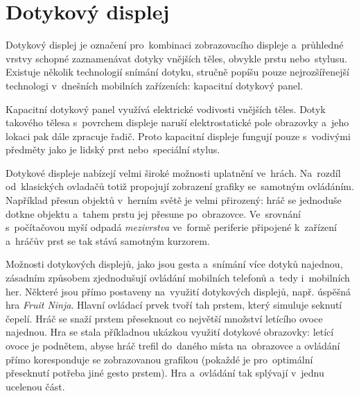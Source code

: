 \documentclass[thesis=B,czech,hidelinks]{FITthesis}[2012/06/26] %
\begin{document}
\section{Dotykový displej}
\label{section:touchscreen}

Dotykový displej je označení pro~kombinaci zobrazovacího displeje a~průhledné vrstvy schopné zaznamenávat dotyky vnějších těles, obvykle prstu nebo~stylusu. Existuje několik technologií snímání dotyku, stručně popíšu pouze nejrozšířenejší technologi v~dnešních mobilních zařízeních: kapacitní dotykový panel.

Kapacitní dotykový panel využívá elektrické vodivosti vnějších těles. Dotyk takového tělesa s~povrchem displeje naruší elektrostatické pole obrazovky a~jeho lokaci pak dále zpracuje řadič. Proto kapacitní displeje fungují pouze s~vodivými předměty jako je lidský prst nebo~speciální stylus. \cite{gray2013does}

Dotykové displeje nabízejí velmi široké možnosti uplatnění ve~hrách. Na~rozdíl od~klasických ovladačů totiž propojují zobrazení grafiky se~samotným ovládáním. Například přesun objektů v~herním světě je velmi přirozený: hráč se jednoduše dotkne objektu a~tahem prstu jej přesune po~obrazovce. Ve~srovnání s~počítačovou myší odpadá \textit{mezivrstva} ve~formě periferie připojené k~zařízení a~hráčův prst se tak stává samotným kurzorem.

Možnosti dotykových displejů, jako jsou gesta a~snímání více dotyků najednou, zásadním způsobem zjednodušují ovládání mobilních telefonů a~tedy i~mobilních her. Některé jsou přímo postaveny na~využití dotykových displejů, např. úspěšná hra \textit{Fruit Ninja}\cite{fruitninja}.  Hlavní ovládací prvek tvoří tah prstem, který simuluje seknutí čepelí. Hráč se snaží prstem přeseknout co největší množství letícího ovoce najednou. Hra se stala příkladnou ukázkou využití dotykové obrazovky: letící ovoce je podnětem, abyse hráč trefil do~daného místa na~obrazovce a ovládání přímo koresponduje se zobrazovanou grafikou (pokaždé je pro~optimální přeseknutí potřeba jiné gesto prstem). Hra a~ovládání tak splývají v~jednu ucelenou část.
\end{document}
